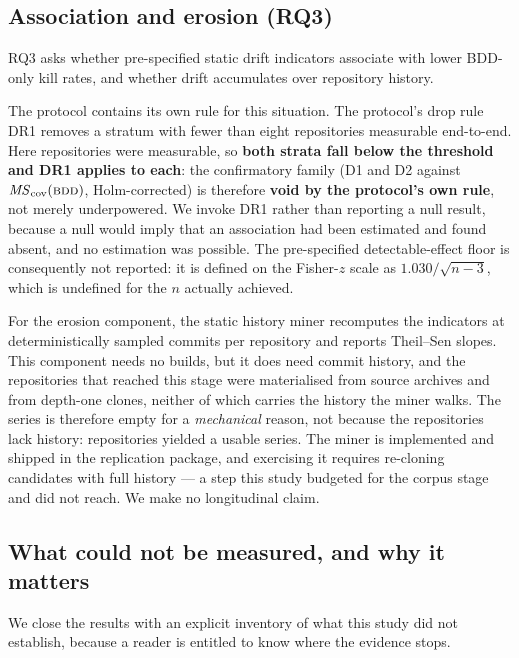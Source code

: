 \subsection{Association and erosion (RQ3)}

RQ3 asks whether pre-specified static drift indicators associate with lower BDD-only kill rates, and
whether drift accumulates over repository history.

The protocol contains its own rule for this situation. The protocol's drop rule DR1 removes a stratum
with fewer than eight repositories measurable end-to-end. Here \Nmeasured{} repositories were
measurable, so \textbf{both strata fall below the threshold and DR1 applies to each}: the confirmatory
family (D1 and D2 against $\mathit{MS}_{\mathrm{cov}}(\textsc{bdd})$, Holm-corrected) is therefore \textbf{void by the protocol's own
rule}, not merely underpowered. We invoke DR1 rather than reporting a null result, because a null
would imply that an association had been estimated and found absent, and no estimation was possible.
The pre-specified detectable-effect floor is consequently not reported: it is defined on the Fisher-$z$
scale as $1.030/\sqrt{n-3}$, which is undefined for the $n$ actually achieved.

For the erosion component, the static history miner recomputes the indicators at \HistoryK{}
deterministically sampled commits per repository and reports Theil--Sen slopes. This component needs
no builds, but it does need commit history, and the repositories that reached this stage were
materialised from source archives and from depth-one clones, neither of which carries the history the
miner walks. The series is therefore empty for a \emph{mechanical} reason, not because the
repositories lack history: \Nhistory{} repositories yielded a usable series. The miner is implemented
and shipped in the replication package, and exercising it requires re-cloning candidates with full
history --- a step this study budgeted for the corpus stage and did not reach. We make no longitudinal
claim.

\HistoryTable

\subsection{What could not be measured, and why it matters}

We close the results with an explicit inventory of what this study did not establish, because a reader
is entitled to know where the evidence stops.


